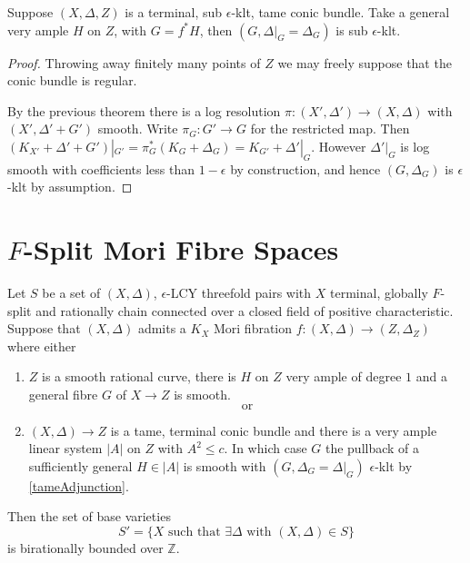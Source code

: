 \begin{corollary}\label{tameAdjunction}
	Suppose $(X,\Delta,Z)$ is a terminal, sub $\epsilon$-klt, tame conic bundle. Take a general very ample $H$ on $Z$, with $G=f^{*}H$, then
	$(G,\Delta|_{G}=\Delta_{G})$ is sub $\epsilon$-klt.
\end{corollary}
\begin{proof}
	Throwing away finitely many points of $Z$ we may freely suppose that the conic bundle is regular.
	
	By the previous theorem there is a log resolution $\pi\colon (X',\Delta') \to (X,\Delta)$ with $(X',\Delta'+G')$ smooth. Write $\pi_{G}\colon G' \to G$ for the restricted map. Then $(K_{X'}+\Delta'+G')|_{G'}=\pi_{G}^{*}(K_{G}+\Delta_{G})=K_{G'}+\Delta'|_{G}$. However $\Delta'|_{G}$ is log smooth with coefficients less than $1-\epsilon$ by construction, and hence $(G,\Delta_{G})$ is $\epsilon$-klt by assumption. 
\end{proof}



\section{$F$-Split Mori Fibre Spaces}

\begin{theorem}\label{setup}
	Let $S$ be a set of $(X,\Delta)$, $\epsilon$-LCY threefold pairs with $X$ terminal, globally $F$-split and rationally chain connected over a closed field of positive characteristic. Suppose that $(X,\Delta)$ admits a $K_{X}$ Mori fibration $f\colon (X,\Delta) \to (Z,\Delta_{Z})$ where either
	\begin{enumerate}
		\item $Z$ is a smooth rational curve, there is $H$ on $Z$ very ample of degree $1$ and a general fibre $G$ of $X \to Z$ is smooth.\\
		\[\text{or}\]
		\item $(X,\Delta) \to Z$ is a tame, terminal conic bundle and there is a very ample linear system $|A|$ on $Z$  with $A^{2} \leq c$. In which case $G$ the pullback of a sufficiently general $H \in |A|$ is smooth with $(G,\Delta_{G}=\Delta|_{G})$ $\epsilon$-klt by \autoref{tameAdjunction}.
	\end{enumerate}
	Then the set of base varieties $$S'=\{X \text{ such that } \exists \Delta \text{ with } (X,\Delta) \in S\}$$ is birationally bounded over $\mathbb{Z}$. 
\end{theorem}


